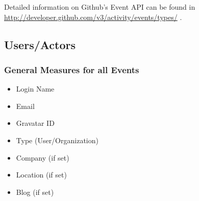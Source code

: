 \documentclass[a4paper,10pt]{article}
\begin{document}
Detailed information on Github's Event API can be found in \url{http://developer.github.com/v3/activity/events/types/} .

\subsection{Users/Actors}
\subsubsection{General Measures for all Events}
\begin{itemize}
 \item Login Name
\item Email
\item Gravatar ID
\item Type (User/Organization)
\item Company (if set)
\item Location (if set)
\item Blog (if set)
\end{itemize}
\end{document}
